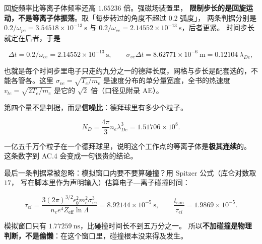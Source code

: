 回旋频率比等离子体频率还高 $1.65236$ 倍。强磁场装置里，
\textbf{限制步长的是回旋运动，不是等离子体振荡}。取「每步转过的角度不超过 $0.2$ 弧度」，
两条判据分别是 $0.2/\omega_{pe}=3.54518\times10^{-13}\ \mathrm{s}$ 与
$0.2/\omega_{ce}=2.14552\times10^{-13}\ \mathrm{s}$，后者更紧。
时间步长就定在后者，于是

\begin{equation}
\Delta t=0.2/\omega_{ce}=2.14552\times10^{-13}\ \mathrm{s},
\qquad
\sigma_{ve}\Delta t=8.62771\times10^{-6}\ \mathrm{m}=0.12104\ \lambda_{De},
\label{eq:app-ac-step}
\end{equation}

也就是每个时间步里电子只走约九分之一的德拜长度，网格与步长是配套选的，不能各管各。这里 $\sigma_{ve}=\sqrt{T_e/m_e}$ 是速度分布的单分量宽度，全书的热速度 $v_{te}=\sqrt{2T_e/m_e}$ 是它的 $\sqrt2$ 倍（口径见附录 AE）。

第四个量不是判据，而是\textbf{信噪比}：德拜球里有多少个粒子。

\begin{equation}
N_D=\frac{4\pi}{3}n_e\lambda_{De}^3=1.51706\times10^{8}.
\label{eq:app-ac-nd}
\end{equation}

一亿五千万个粒子在一个德拜球里，说明这个工作点的等离子体是\textbf{极其连续}的。
这条数字到 AC.4 会变成一句很贵的结论。

最后一条判据常被忽略：模拟窗口内要不要算碰撞？用 Spitzer 公式（库仑对数取 $17$，
写在脚本里作为声明输入）估算电子—离子碰撞时间：

\begin{equation}
\tau_{ei}=\frac{3(2\pi)^{3/2}\epsilon_0^2 m_e^2 \sigma_{ve}^3}{n_e e^4 Z_{\mathrm{eff}}\ln\Lambda}
=8.92144\times10^{-5}\ \mathrm{s},
\qquad
\frac{t_{\mathrm{sim}}}{\tau_{ei}}=1.9869\times10^{-5}.
\label{eq:app-ac-collision}
\end{equation}

模拟窗口只有 $1.77259\ \mathrm{ns}$，比碰撞时间长不到五万分之一。
所以\textbf{不加碰撞是物理判断，不是偷懒}：在这个窗口里，碰撞根本没来得及发生。

